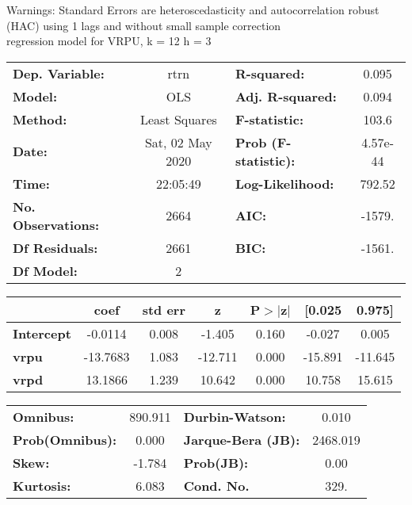 Warnings: \newline
 [1] Standard Errors are heteroscedasticity and autocorrelation robust (HAC) using 1 lags and without small sample correction\\ 

regression model for VRPU, k = 12 h = 3\begin{center}
\begin{tabular}{lclc}
\toprule
\textbf{Dep. Variable:}    &       rtrn       & \textbf{  R-squared:         } &     0.095   \\
\textbf{Model:}            &       OLS        & \textbf{  Adj. R-squared:    } &     0.094   \\
\textbf{Method:}           &  Least Squares   & \textbf{  F-statistic:       } &     103.6   \\
\textbf{Date:}             & Sat, 02 May 2020 & \textbf{  Prob (F-statistic):} &  4.57e-44   \\
\textbf{Time:}             &     22:05:49     & \textbf{  Log-Likelihood:    } &    792.52   \\
\textbf{No. Observations:} &        2664      & \textbf{  AIC:               } &    -1579.   \\
\textbf{Df Residuals:}     &        2661      & \textbf{  BIC:               } &    -1561.   \\
\textbf{Df Model:}         &           2      & \textbf{                     } &             \\
\bottomrule
\end{tabular}
\begin{tabular}{lcccccc}
                   & \textbf{coef} & \textbf{std err} & \textbf{z} & \textbf{P$> |$z$|$} & \textbf{[0.025} & \textbf{0.975]}  \\
\midrule
\textbf{Intercept} &      -0.0114  &        0.008     &    -1.405  &         0.160        &       -0.027    &        0.005     \\
\textbf{vrpu}      &     -13.7683  &        1.083     &   -12.711  &         0.000        &      -15.891    &      -11.645     \\
\textbf{vrpd}      &      13.1866  &        1.239     &    10.642  &         0.000        &       10.758    &       15.615     \\
\bottomrule
\end{tabular}
\begin{tabular}{lclc}
\textbf{Omnibus:}       & 890.911 & \textbf{  Durbin-Watson:     } &    0.010  \\
\textbf{Prob(Omnibus):} &   0.000 & \textbf{  Jarque-Bera (JB):  } & 2468.019  \\
\textbf{Skew:}          &  -1.784 & \textbf{  Prob(JB):          } &     0.00  \\
\textbf{Kurtosis:}      &   6.083 & \textbf{  Cond. No.          } &     329.  \\
\bottomrule
\end{tabular}
\end{center}

